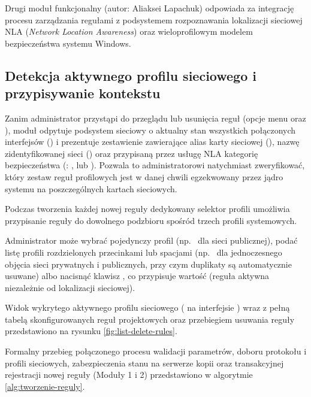 Drugi moduł funkcjonalny (autor: Aliaksei Lapachuk) odpowiada za integrację procesu zarządzania regułami z podsystemem rozpoznawania lokalizacji sieciowej NLA (\textit{Network Location Awareness}) oraz wieloprofilowym modelem bezpieczeństwa systemu Windows.

\subsection{Detekcja aktywnego profilu sieciowego i przypisywanie kontekstu}\label{subsec:detekcja-profilu}

Zanim administrator przystąpi do przeglądu lub usunięcia reguł (opcje menu  oraz ), moduł odpytuje podsystem sieciowy o aktualny stan wszystkich połączonych interfejsów () i prezentuje zestawienie zawierające alias karty sieciowej (), nazwę zidentyfikowanej sieci () oraz przypisaną przez usługę NLA kategorię bezpieczeństwa (: ,  lub ). Pozwala to administratorowi natychmiast zweryfikować, który zestaw reguł profilowych jest w danej chwili egzekwowany przez jądro systemu na poszczególnych kartach sieciowych.

Podczas tworzenia każdej nowej reguły dedykowany selektor profili umożliwia przypisanie reguły do dowolnego podzbioru spośród trzech profili systemowych.

Administrator może wybrać pojedynczy profil (np.\  dla sieci publicznej), podać listę profili rozdzielonych przecinkami lub spacjami (np.\  dla jednoczesnego objęcia sieci prywatnych i publicznych, przy czym duplikaty są automatycznie usuwane) albo nacisnąć klawisz , co przypisuje wartość  (reguła aktywna niezależnie od lokalizacji sieciowej).

Widok wykrytego aktywnego profilu sieciowego ( na interfejsie ) wraz z pełną tabelą skonfigurowanych reguł projektowych oraz przebiegiem usuwania reguły przedstawiono na rysunku \ref{fig:list-delete-rules}.


Formalny przebieg połączonego procesu walidacji parametrów, doboru protokołu i profili sieciowych, zabezpieczenia stanu na serwerze kopii oraz transakcyjnej rejestracji nowej reguły (Moduły 1 i 2) przedstawiono w algorytmie \ref{alg:tworzenie-reguly}.

